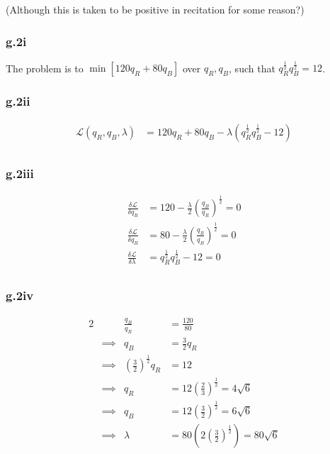 \documentclass[12pt,letterpaper]{article}
\theoremstyle{definition}
\newcommand{\Lag}{\mathcal{L}}
\begin{document}
(Although this is taken to be positive in recitation for some reason?)

\subsubsection*{g.2i}

The problem is to $\min[120q_R + 80q_B]$ over $q_R,q_B$, such that
$q_R^{\frac{1}{2}}q_B^{\frac{1}{2}} = 12$.

\subsubsection*{g.2ii}

\begin{align*}
  \Lag(q_R,q_B,\lambda) &= 120q_R + 80q_B - \lambda(q_R^{\frac{1}{2}}q_B^{\frac{1}{2}} - 12) \\
\end{align*}

\subsubsection*{g.2iii}

\begin{align*}
  \frac{\delta \Lag}{\delta q_R} &= 120 - \frac{\lambda}{2}(\frac{q_B}{q_R})^{\frac{1}{2}} = 0 \\
  \frac{\delta \Lag}{\delta q_B} &= 80 - \frac{\lambda}{2}(\frac{q_R}{q_B})^{\frac{1}{2}} = 0 \\
  \frac{\delta \Lag}{\delta \lambda} &= q_R^{\frac{1}{2}}q_B^{\frac{1}{2}} - 12 = 0 \\
\end{align*}

\subsubsection*{g.2iv}

\begin{alignat*}{2}
  && \frac{q_B}{q_R} &= \frac{120}{80} \\
  &\implies& q_B &= \frac{3}{2}q_R \\
  &\implies& (\frac{3}{2})^{\frac{1}{2}}q_R &= 12 \\
  &\implies& q_R &= 12(\frac{2}{3})^{\frac{1}{2}} = 4\sqrt{6} \\
  &\implies& q_B &= 12(\frac{3}{2})^{\frac{1}{2}} = 6\sqrt{6} \\
  &\implies& \lambda &= 80(2(\frac{3}{2})^{\frac{1}{2}}) = 80\sqrt{6} 
\end{alignat*}
\end{document}
